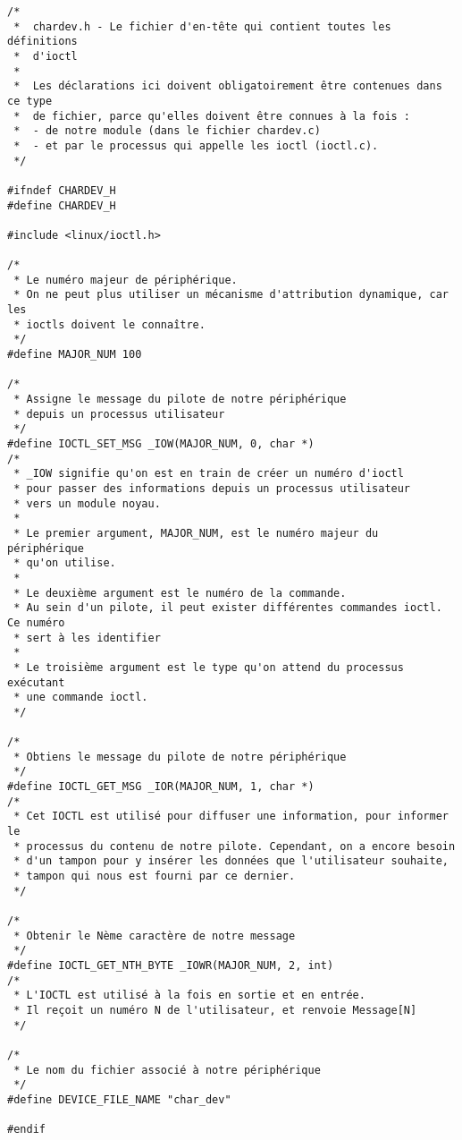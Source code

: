\documentclass[11pt]{article}
\begin{document}
\begin{verbatim}
/*
 *  chardev.h - Le fichier d'en-tête qui contient toutes les définitions
 *  d'ioctl
 *
 *  Les déclarations ici doivent obligatoirement être contenues dans ce type
 *  de fichier, parce qu'elles doivent être connues à la fois :
 *  - de notre module (dans le fichier chardev.c)
 *  - et par le processus qui appelle les ioctl (ioctl.c).
 */

#ifndef CHARDEV_H
#define CHARDEV_H

#include <linux/ioctl.h>

/*
 * Le numéro majeur de périphérique.
 * On ne peut plus utiliser un mécanisme d'attribution dynamique, car les
 * ioctls doivent le connaître.
 */
#define MAJOR_NUM 100

/*
 * Assigne le message du pilote de notre périphérique
 * depuis un processus utilisateur
 */
#define IOCTL_SET_MSG _IOW(MAJOR_NUM, 0, char *)
/*
 * _IOW signifie qu'on est en train de créer un numéro d'ioctl
 * pour passer des informations depuis un processus utilisateur
 * vers un module noyau.
 *
 * Le premier argument, MAJOR_NUM, est le numéro majeur du périphérique
 * qu'on utilise.
 *
 * Le deuxième argument est le numéro de la commande.
 * Au sein d'un pilote, il peut exister différentes commandes ioctl. Ce numéro
 * sert à les identifier
 *
 * Le troisième argument est le type qu'on attend du processus exécutant
 * une commande ioctl.
 */

/*
 * Obtiens le message du pilote de notre périphérique
 */
#define IOCTL_GET_MSG _IOR(MAJOR_NUM, 1, char *)
/*
 * Cet IOCTL est utilisé pour diffuser une information, pour informer le
 * processus du contenu de notre pilote. Cependant, on a encore besoin
 * d'un tampon pour y insérer les données que l'utilisateur souhaite,
 * tampon qui nous est fourni par ce dernier.
 */

/*
 * Obtenir le Nème caractère de notre message
 */
#define IOCTL_GET_NTH_BYTE _IOWR(MAJOR_NUM, 2, int)
/*
 * L'IOCTL est utilisé à la fois en sortie et en entrée.
 * Il reçoit un numéro N de l'utilisateur, et renvoie Message[N]
 */

/*
 * Le nom du fichier associé à notre périphérique
 */
#define DEVICE_FILE_NAME "char_dev"

#endif
\end{verbatim}
\end{document}
